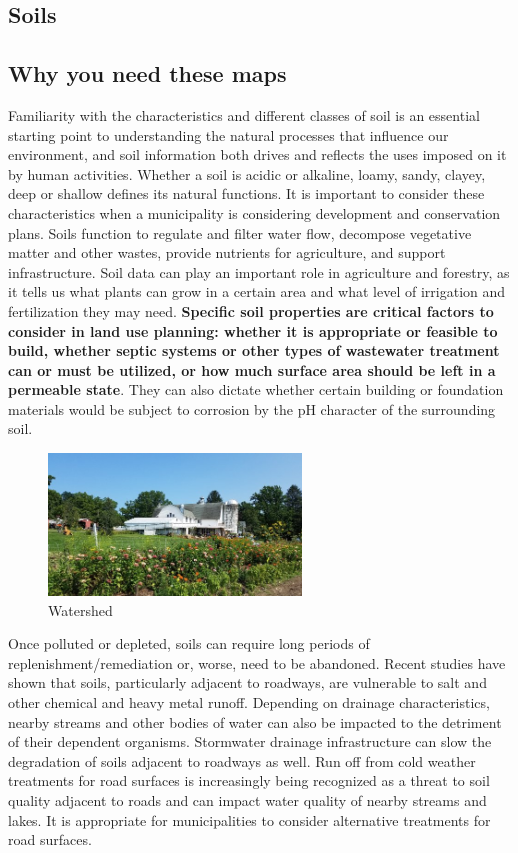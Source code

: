 \label{map:steepslopes}

\subsection{Soils}\label{subsec:soils}
\subsection*{Why you need these maps}
Familiarity with the characteristics and different classes of soil is an 
essential starting point to understanding the natural processes that influence 
our environment, and soil information both drives and reflects the uses imposed 
on it by human activities. Whether a soil is acidic or alkaline, loamy, sandy, 
clayey, deep or shallow defines its natural functions. It is important to 
consider these characteristics when a municipality is considering development 
and conservation plans. Soils function to regulate and filter water flow, 
decompose vegetative matter and other wastes, provide nutrients for agriculture, 
and support infrastructure. Soil data can play an important role in agriculture 
and forestry, as it tells us what plants can grow in a certain area and what 
level of irrigation and fertilization they may need. \textbf{Specific soil 
properties are critical factors to consider in land use planning: whether it is 
appropriate or feasible to build, whether septic systems or other types of 
wastewater treatment can or must be utilized, or how much surface area should be 
left in a permeable state}. They can also dictate whether certain building or 
foundation materials would be subject to corrosion by the pH character of the 
surrounding soil. 

\begin{figure}
    \includegraphics[width=0.6\textwidth]{images/asdasd.jpg}
  \caption{Watershed}
\end{figure}
Once polluted or depleted, soils can require long periods of 
replenishment/remediation or, worse, need to be abandoned. Recent studies have 
shown that soils, particularly adjacent to roadways, are vulnerable to salt and 
other chemical and heavy metal runoff. Depending on drainage characteristics, 
nearby streams and other bodies of water can also be impacted to the detriment 
of their dependent organisms. Stormwater drainage infrastructure can slow the 
degradation of soils adjacent to roadways as well. Run off from cold weather 
treatments for road surfaces is increasingly being recognized as a threat to 
soil quality adjacent to roads and can impact water quality of nearby streams 
and lakes. It is appropriate for municipalities to consider alternative 
treatments for road surfaces. 

